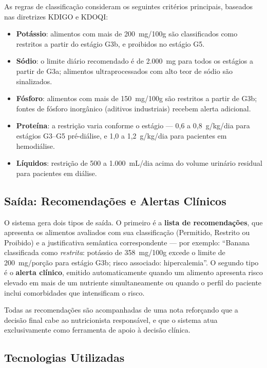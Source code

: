 \documentclass[12pt, a4paper, twocolumn]{article}
\begin{document}
As regras de classificação consideram os seguintes critérios principais, baseados nas diretrizes KDIGO e KDOQI:

\begin{itemize}
    \item \textbf{Potássio}: alimentos com mais de 200~mg/100g são classificados como restritos a partir do estágio G3b, e proibidos no estágio G5.
    \item \textbf{Sódio}: o limite diário recomendado é de 2.000~mg para todos os estágios a partir de G3a; alimentos ultraprocessados com alto teor de sódio são sinalizados.
    \item \textbf{Fósforo}: alimentos com mais de 150~mg/100g são restritos a partir de G3b; fontes de fósforo inorgânico (aditivos industriais) recebem alerta adicional.
    \item \textbf{Proteína}: a restrição varia conforme o estágio --- 0,6 a 0,8~g/kg/dia para estágios G3--G5 pré-diálise, e 1,0 a 1,2~g/kg/dia para pacientes em hemodiálise.
    \item \textbf{Líquidos}: restrição de 500 a 1.000~mL/dia acima do volume urinário residual para pacientes em diálise.
\end{itemize}

    \subsection{Saída: Recomendações e Alertas Clínicos}

O sistema gera dois tipos de saída. O primeiro é a \textbf{lista de recomendações}, que apresenta os alimentos avaliados com sua classificação (Permitido, Restrito ou Proibido) e a justificativa semântica correspondente --- por exemplo: ``Banana classificada como \textit{restrita}: potássio de 358~mg/100g excede o limite de 200~mg/porção para estágio G3b; risco associado: hipercalemia''. O segundo tipo é o \textbf{alerta clínico}, emitido automaticamente quando um alimento apresenta risco elevado em mais de um nutriente simultaneamente ou quando o perfil do paciente inclui comorbidades que intensificam o risco.

Todas as recomendações são acompanhadas de uma nota reforçando que a decisão final cabe ao nutricionista responsável, e que o sistema atua exclusivamente como ferramenta de apoio à decisão clínica.

    \subsection{Tecnologias Utilizadas}
\end{document}
